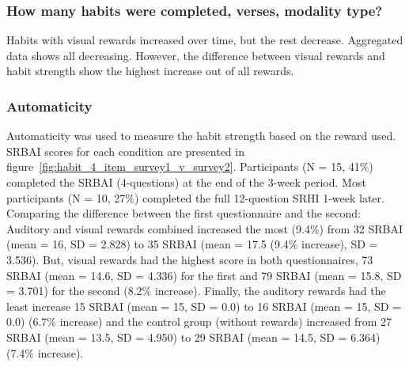 \documentclass{scaffold/sigchi}
\begin{document}
\subsubsection{How many habits were completed, verses, modality type?}
Habits with visual rewards increased over time, but the rest decrease. Aggregated data shows all decreasing. However, the difference between visual rewards and habit strength show the highest increase out of all rewards.


\subsubsection{Automaticity}
Automaticity was used to measure the habit strength based on the reward used. SRBAI scores for each condition are presented in figure~\ref{fig:habit_4_item_survey1_v_survey2}.
Participants (N = 15, 41\%) completed the SRBAI (4-questions) at the end of the 3-week period. Most participants (N = 10, 27\%) completed the full 12-question SRHI 1-week later. Comparing the difference between the first questionnaire and the second: Auditory and visual rewards combined increased the most (9.4\%) from 32 SRBAI (mean = 16, SD = 2.828) to 35 SRBAI (mean = 17.5 (9.4\% increase), SD = 3.536). But, visual rewards had the highest score in both questionnaires, 73 SRBAI (mean = 14.6, SD = 4.336) for the first and 79 SRBAI (mean = 15.8, SD = 3.701) for the second (8.2\% increase). Finally, the auditory rewards had the least increase 15 SRBAI (mean = 15, SD = 0.0) to 16 SRBAI (mean = 15, SD = 0.0) (6.7\% increase) and the control group (without rewards) increased from 27 SRBAI (mean = 13.5, SD = 4.950) to 29 SRBAI (mean = 14.5, SD = 6.364) (7.4\% increase).

\end{document}
